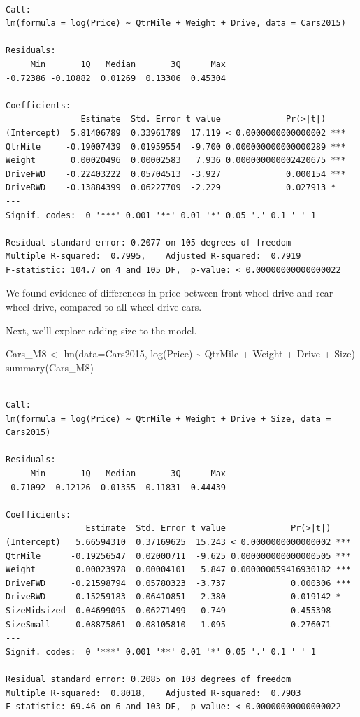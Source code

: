 \documentclass[
  letterpaper,
  DIV=11,
  numbers=noendperiod]{scrreprt}
\newenvironment{Shaded}{\begin{snugshade}}{\end{snugshade}}
\newcommand{\AttributeTok}[1]{\textcolor[rgb]{0.40,0.45,0.13}{#1}}
\newcommand{\FunctionTok}[1]{\textcolor[rgb]{0.28,0.35,0.67}{#1}}
\newcommand{\NormalTok}[1]{\textcolor[rgb]{0.00,0.23,0.31}{#1}}
\newcommand{\OtherTok}[1]{\textcolor[rgb]{0.00,0.23,0.31}{#1}}
\newcommand{\SpecialCharTok}[1]{\textcolor[rgb]{0.37,0.37,0.37}{#1}}
\begin{document}
\begin{verbatim}

Call:
lm(formula = log(Price) ~ QtrMile + Weight + Drive, data = Cars2015)

Residuals:
     Min       1Q   Median       3Q      Max 
-0.72386 -0.10882  0.01269  0.13306  0.45304 

Coefficients:
               Estimate  Std. Error t value             Pr(>|t|)    
(Intercept)  5.81406789  0.33961789  17.119 < 0.0000000000000002 ***
QtrMile     -0.19007439  0.01959554  -9.700 0.000000000000000289 ***
Weight       0.00020496  0.00002583   7.936 0.000000000002420675 ***
DriveFWD    -0.22403222  0.05704513  -3.927             0.000154 ***
DriveRWD    -0.13884399  0.06227709  -2.229             0.027913 *  
---
Signif. codes:  0 '***' 0.001 '**' 0.01 '*' 0.05 '.' 0.1 ' ' 1

Residual standard error: 0.2077 on 105 degrees of freedom
Multiple R-squared:  0.7995,    Adjusted R-squared:  0.7919 
F-statistic: 104.7 on 4 and 105 DF,  p-value: < 0.00000000000000022
\end{verbatim}

We found evidence of differences in price between front-wheel drive and
rear-wheel drive, compared to all wheel drive cars.

Next, we'll explore adding size to the model.

\begin{Shaded}
\begin{Highlighting}[]
\NormalTok{Cars\_M8 }\OtherTok{\textless{}{-}} \FunctionTok{lm}\NormalTok{(}\AttributeTok{data=}\NormalTok{Cars2015, }\FunctionTok{log}\NormalTok{(Price) }\SpecialCharTok{\textasciitilde{}}\NormalTok{ QtrMile }\SpecialCharTok{+}\NormalTok{ Weight }\SpecialCharTok{+}\NormalTok{ Drive }\SpecialCharTok{+}\NormalTok{ Size)}
\FunctionTok{summary}\NormalTok{(Cars\_M8)}
\end{Highlighting}
\end{Shaded}

\begin{verbatim}

Call:
lm(formula = log(Price) ~ QtrMile + Weight + Drive + Size, data = Cars2015)

Residuals:
     Min       1Q   Median       3Q      Max 
-0.71092 -0.12126  0.01355  0.11831  0.44439 

Coefficients:
                Estimate  Std. Error t value             Pr(>|t|)    
(Intercept)   5.66594310  0.37169625  15.243 < 0.0000000000000002 ***
QtrMile      -0.19256547  0.02000711  -9.625 0.000000000000000505 ***
Weight        0.00023978  0.00004101   5.847 0.000000059416930182 ***
DriveFWD     -0.21598794  0.05780323  -3.737             0.000306 ***
DriveRWD     -0.15259183  0.06410851  -2.380             0.019142 *  
SizeMidsized  0.04699095  0.06271499   0.749             0.455398    
SizeSmall     0.08875861  0.08105810   1.095             0.276071    
---
Signif. codes:  0 '***' 0.001 '**' 0.01 '*' 0.05 '.' 0.1 ' ' 1

Residual standard error: 0.2085 on 103 degrees of freedom
Multiple R-squared:  0.8018,    Adjusted R-squared:  0.7903 
F-statistic: 69.46 on 6 and 103 DF,  p-value: < 0.00000000000000022
\end{verbatim}
\end{document}
